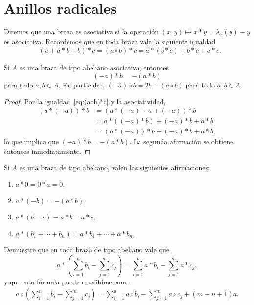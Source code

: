 \chapter{Anillos radicales}

Diremos que una braza es asociativa si la operación $(x,y)\mapsto
x*y=\lambda_x(y)-y$ es asociativa. Recordemos que en toda braza
vale la siguiente igualdad
\begin{align}
    \label{eq:(aob)*c}
    &(a+a*b+b)*c=(a\circ b)*c=a*(b*c)+b*c+a*c.
\end{align}

\begin{lemma}
	Si $A$ es una braza de tipo abeliano asociativa, entonces 
	\[
		(-a)*b=-(a*b)
	\]
	para todo $a,b\in A$. En particular, $(-a)\circ b=2b-(a\circ b)$ para todo $a,b\in A$. 
\end{lemma}

\begin{proof}
    Por la igualdad~\eqref{eq:(aob)*c} y la
    asociatividad, 
	\begin{align*}
	    (a*(-a))*b &= 
	    (a*(-a)+a+(-a))*b\\
	    &=a*( (-a)*b)+(-a)*b+a*b\\
	    &=(a*(-a))*b+(-a)*b+a*b,
    \end{align*}
    lo que implica que $(-a)*b=-(a*b)$. La segunda afirmación se obtiene
    entonces inmediatamente. 
\end{proof}

\begin{lemma}
Si $A$ es una braza de tipo abeliano, valen las siguientes
afirmaciones:
\begin{enumerate}
    \item $a*0=0*a=0$,
    \item $a*(-b)=-(a*b)$,
    \item $a*(b-c)=a*b-a*c$,
    \item $a*(b_1+\cdots+b_n)=a*b_1+\cdots+a*b_n$,
\end{enumerate}
\end{lemma}

\begin{exercise}
Demuestre que en toda braza de tipo abeliano vale
que 
\[
    a*\left(\sum_{i=1}^nb_i-\sum_{j=1}^mc_j\right)=\sum_{i=1}^na*b_i-\sum_{j=1}^ma*c_j,
\]
y que esta fórmula puede rescribirse como
\begin{align}
\label{eq:Lau}
a\circ \left(\sum_{i=1}^n b_i-\sum_{j=1}^mc_j\right)
=\sum_{i=1}^n a\circ b_i-\sum_{j=1}^ma\circ c_j+(m-n+1)a.
\end{align}
\end{exercise}

